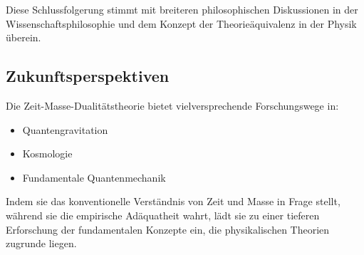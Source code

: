 \documentclass[a4paper,12pt]{article}
\begin{document}
	Diese Schlussfolgerung stimmt mit breiteren philosophischen Diskussionen in der Wissenschaftsphilosophie \cite{Kuhn1962} und dem Konzept der Theorieäquivalenz in der Physik \cite{Weatherall2019} überein.
	
	\subsection{Zukunftsperspektiven}
	Die Zeit-Masse-Dualitätstheorie bietet vielversprechende Forschungswege in:
	
	\begin{itemize}
		\item Quantengravitation
		\item Kosmologie
		\item Fundamentale Quantenmechanik
	\end{itemize}
	
	Indem sie das konventionelle Verständnis von Zeit und Masse in Frage stellt, während sie die empirische Adäquatheit wahrt, lädt sie zu einer tieferen Erforschung der fundamentalen Konzepte ein, die physikalischen Theorien zugrunde liegen.
	
\end{document}
